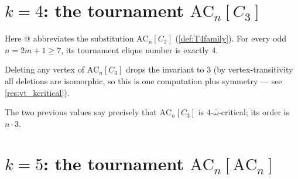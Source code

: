 

\section*{$k = 4$: the tournament $\mathrm{AC}_n[C_3]$}




\begin{decoded}
Here @ abbreviates the substitution
$\mathrm{AC}_n[C_3]$ (\cref{def:T4family}). For every odd
$n = 2m{+}1 \ge 7$, its tournament clique number is exactly $4$.
\end{decoded}






\begin{decoded}
Deleting any vertex of $\mathrm{AC}_n[C_3]$ drops the invariant to
$3$ (by vertex-transitivity all deletions are isomorphic, so this is
one computation plus symmetry --- see \cref{res:vt_kcritical}).
\end{decoded}






\label{res:card_T4}

\begin{decoded}
The two previous values say precisely that $\mathrm{AC}_n[C_3]$ is
$4$-$\bar\omega$-critical; its order is $n \cdot 3$.
\end{decoded}



\section*{$k = 5$: the tournament $\mathrm{AC}_n[\mathrm{AC}_n]$}




